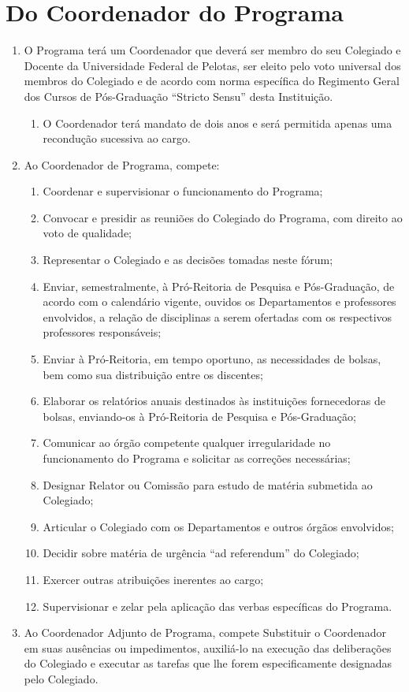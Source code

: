 \documentclass{article}
\newcommand{\singleitem}{\item[Parágrafo Único.]}
\begin{document}
\section{Do Coordenador do Programa}
\begin{enumerate}
	\item O Programa terá um Coordenador que deverá ser membro do seu Colegiado e Docente da Universidade Federal de Pelotas, ser eleito pelo voto universal dos membros do Colegiado e de acordo com norma específica do Regimento Geral dos Cursos de Pós-Graduação ``Stricto Sensu'' desta Instituição.
	\begin{enumerate}
		\singleitem O Coordenador terá mandato de dois anos e será permitida apenas uma recondução sucessiva ao cargo.
	\end{enumerate}

	\item Ao Coordenador de Programa, compete:
	\begin{enumerate}
		\item Coordenar e supervisionar o funcionamento do Programa;
		\item Convocar e presidir as reuniões do Colegiado do Programa, com direito ao voto de qualidade;
		\item Representar o Colegiado e as decisões tomadas neste fórum;
		\item Enviar, semestralmente, à Pró-Reitoria de Pesquisa e Pós-Graduação, de acordo com o calendário vigente, ouvidos os Departamentos e professores envolvidos, a relação de disciplinas a serem ofertadas com os respectivos professores responsáveis;
		\item Enviar à Pró-Reitoria, em tempo oportuno, as necessidades de bolsas, bem como sua distribuição entre os discentes;
		\item Elaborar os relatórios anuais destinados às instituições fornecedoras de bolsas, enviando-os à Pró-Reitoria de Pesquisa e Pós-Graduação;
		\item Comunicar ao órgão competente qualquer irregularidade no funcionamento do Programa e solicitar as correções necessárias;
		\item Designar Relator ou Comissão para estudo de matéria submetida ao Colegiado;
		\item Articular o Colegiado com os Departamentos e outros órgãos envolvidos;
		\item Decidir sobre matéria de urgência ``ad referendum'' do Colegiado;
		\item Exercer outras atribuições inerentes ao cargo;
		\item Supervisionar e zelar pela aplicação das verbas específicas do Programa.

	\end{enumerate}

	\item Ao Coordenador Adjunto de Programa, compete Substituir o Coordenador em suas ausências ou impedimentos, auxiliá-lo na execução das deliberações do Colegiado e executar as tarefas que lhe forem especificamente designadas pelo Colegiado.
\end{enumerate}
\end{document}
